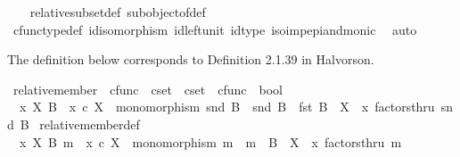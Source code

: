 \begin{isabellebody}
%
\isadelimproof
\ \ %
\endisadelimproof
%
\isatagproof
{}\isamarkupfalse%
\ relative{\isacharunderscore}{\kern0pt}subset{\isacharunderscore}{\kern0pt}def{}\ subobject{\isacharunderscore}{\kern0pt}of{\isacharunderscore}{\kern0pt}def{}\isanewline
\ \ \isamarkupfalse%
\ cfunc{\isacharunderscore}{\kern0pt}type{\isacharunderscore}{\kern0pt}def\ id{\isacharunderscore}{\kern0pt}isomorphism\ id{\isacharunderscore}{\kern0pt}left{\isacharunderscore}{\kern0pt}unit\ id{\isacharunderscore}{\kern0pt}type\ iso{\isacharunderscore}{\kern0pt}imp{\isacharunderscore}{\kern0pt}epi{\isacharunderscore}{\kern0pt}and{\isacharunderscore}{\kern0pt}monic\ \isamarkupfalse%
\ auto%
\endisatagproof
{\isafoldproof}%
%
\isadelimproof
%
\endisadelimproof
%
\begin{isamarkuptext}%
The definition below corresponds to Definition 2.1.39 in Halvorson.%
\end{isamarkuptext}\isamarkuptrue%
\isamarkupfalse%
\ relative{\isacharunderscore}{\kern0pt}member\ {\isacharcolon}{\kern0pt}{\isacharcolon}{\kern0pt}\ {\isachardoublequoteopen}cfunc\ {\isasymRightarrow}\ cset\ {\isasymRightarrow}\ cset\ {\isasymtimes}\ cfunc\ {\isasymRightarrow}\ bool{\isachardoublequoteclose}\ {\isacharparenleft}{\kern0pt}{\isachardoublequoteopen}{\isacharunderscore}{\kern0pt}\ {\isasymin}\isactrlbsub {\isacharunderscore}{\kern0pt}\isactrlesub \ {\isacharunderscore}{\kern0pt}{\isachardoublequoteclose}\ {\isacharbrackleft}{\kern0pt}{}{}{\isacharcomma}{\kern0pt}{}{}{\isacharcomma}{\kern0pt}{}{}{\isacharbrackright}{\kern0pt}{}{}{\isacharparenright}{\kern0pt}\ \isanewline
\ \ {\isachardoublequoteopen}x\ {\isasymin}\isactrlbsub X\isactrlesub \ B\ {\isasymlongleftrightarrow}\ {\isacharparenleft}{\kern0pt}x\ {\isasymin}\isactrlsub c\ X\ {\isasymand}\ monomorphism\ {\isacharparenleft}{\kern0pt}snd\ B{\isacharparenright}{\kern0pt}\ {\isasymand}\ snd\ B\ {\isacharcolon}{\kern0pt}\ fst\ B\ {\isasymrightarrow}\ X\ {\isasymand}\ x\ factorsthru\ {\isacharparenleft}{\kern0pt}snd\ B{\isacharparenright}{\kern0pt}{\isacharparenright}{\kern0pt}{\isachardoublequoteclose}\isanewline
\isanewline
{}\isamarkupfalse%
\ relative{\isacharunderscore}{\kern0pt}member{\isacharunderscore}{\kern0pt}def{}{\isacharcolon}{\kern0pt}\isanewline
\ \ {\isachardoublequoteopen}x\ {\isasymin}\isactrlbsub X\isactrlesub \ {\isacharparenleft}{\kern0pt}B{\isacharcomma}{\kern0pt}\ m{\isacharparenright}{\kern0pt}\ {\isacharequal}{\kern0pt}\ {\isacharparenleft}{\kern0pt}x\ {\isasymin}\isactrlsub c\ X\ {\isasymand}\ monomorphism\ m\ {\isasymand}\ m\ {\isacharcolon}{\kern0pt}\ B\ {\isasymrightarrow}\ X\ {\isasymand}\ x\ factorsthru\ m{\isacharparenright}{\kern0pt}{\isachardoublequoteclose}\isanewline

\end{isabellebody}
